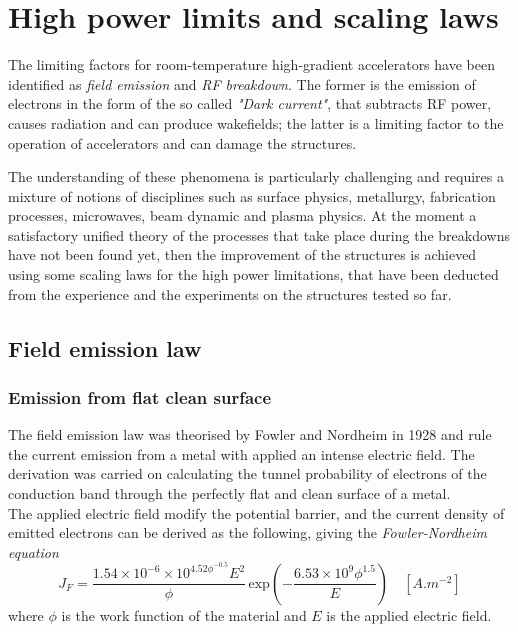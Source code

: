 \section[High power limits and scaling laws]{High power limits and scaling laws}

The limiting factors for room-temperature high-gradient accelerators have been identified as \textit{field emission} and \textit{RF breakdown}. The former is the emission of electrons in the form of the so called \textit{"Dark current"}, that subtracts RF power, causes radiation and can produce wakefields; the latter is a limiting factor to the operation of accelerators and can damage the structures.\cite{Wang:1997ip}

The understanding of these phenomena is particularly challenging and requires a mixture of notions of disciplines such as surface physics, metallurgy, fabrication processes, microwaves, beam dynamic and plasma physics. At the moment a satisfactory unified theory of the processes that take place during the breakdowns have not been found yet, then the improvement of the structures is achieved using some scaling laws for the high power limitations, that have been deducted from the experience and the experiments on the structures tested so far. 


\subsection[Field emission law]{Field emission law}

\subsubsection{Emission from flat clean surface}

The field emission law was theorised by Fowler and Nordheim in 1928 and rule the current emission from a metal with applied an intense electric field. The derivation was carried on calculating the tunnel probability of electrons of the conduction band through the perfectly flat and clean surface of a metal. \\The applied electric field modify the potential barrier, and the current density of emitted electrons can be derived as the following, giving the  \textit{Fowler-Nordheim equation} \cite{Fowler173}
\begin{equation}
J_F = \frac{ 1.54\times10^{-6} \times 10^{4.52\phi^{-0.5}} E^2}{  \phi } \, \text{exp} \left ( -\frac{6.53\times 10^9 \phi^{1.5}}{E} \right ) \quad [A.m^{-2}]  \label{FNlaw}
\end{equation}
where $\phi$ is the work function of the material and $E$ is the applied electric field.

